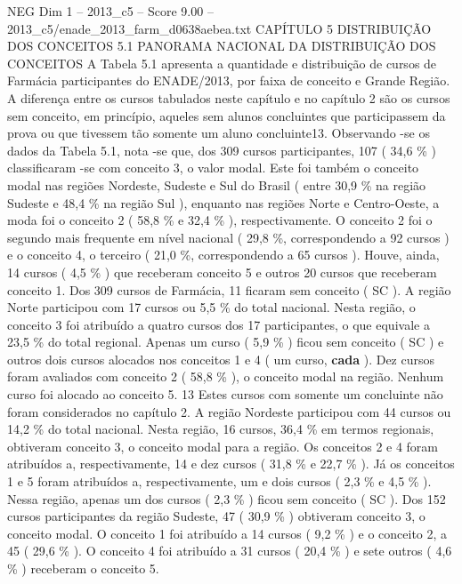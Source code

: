 \begin{textsample}{NEG Dim 1 – 2013\_c5 – Score 9.00 – 2013\_c5/enade\_2013\_farm\_d0638aebea.txt}  \label{ex:f1_neg_360}
CAPÍTULO 5 DISTRIBUIÇÃO DOS CONCEITOS 5.1 PANORAMA NACIONAL DA DISTRIBUIÇÃO DOS CONCEITOS A Tabela 5.1 apresenta a quantidade e distribuição de cursos de Farmácia participantes do ENADE/2013, por faixa de conceito e Grande Região.
A diferença entre os cursos tabulados neste capítulo e no capítulo 2 são os cursos sem conceito, em princípio, aqueles sem alunos concluintes que participassem da prova ou que tivessem tão somente um aluno concluinte13.
Observando -se os dados da Tabela 5.1, nota -se que, dos 309 cursos participantes, 107 ( 34,6 \% ) classificaram -se com conceito 3, o valor modal.
Este foi também o conceito modal nas regiões Nordeste, Sudeste e Sul do Brasil ( entre 30,9 \% na região Sudeste e 48,4 \% na região Sul ), enquanto nas regiões Norte e Centro-Oeste, a moda foi o conceito 2 ( 58,8 \% e 32,4 \% ), respectivamente.
O conceito 2 foi o segundo mais frequente em nível nacional ( 29,8 \%, correspondendo a 92 cursos ) e o conceito 4, o terceiro ( 21,0 \%, correspondendo a 65 cursos ).
Houve, ainda, 14 cursos ( 4,5 \% ) que receberam conceito 5 e outros 20 cursos que receberam conceito 1.
Dos 309 cursos de Farmácia, 11 ficaram sem conceito ( SC ).
A região Norte participou com 17 cursos ou 5,5 \% do total nacional.
Nesta região, o conceito 3 foi atribuído a quatro cursos dos 17 participantes, o que equivale a 23,5 \% do total regional.
Apenas um curso ( 5,9 \% ) ficou sem conceito ( SC ) e outros dois cursos alocados nos conceitos 1 e 4 ( um curso, \textbf{cada} ).
Dez cursos foram avaliados com conceito 2 ( 58,8 \% ), o conceito modal na região.
Nenhum curso foi alocado ao conceito 5. 13 Estes cursos com somente um concluinte não foram considerados no capítulo 2.
A região Nordeste participou com 44 cursos ou 14,2 \% do total nacional.
Nesta região, 16 cursos, 36,4 \% em termos regionais, obtiveram conceito 3, o conceito modal para a região.
Os conceitos 2 e 4 foram atribuídos a, respectivamente, 14 e dez cursos ( 31,8 \% e 22,7 \% ).
Já os conceitos 1 e 5 foram atribuídos a, respectivamente, um e dois cursos ( 2,3 \% e 4,5 \% ).
Nessa região, apenas um dos cursos ( 2,3 \% ) ficou sem conceito ( SC ).
Dos 152 cursos participantes da região Sudeste, 47 ( 30,9 \% ) obtiveram conceito 3, o conceito modal.
O conceito 1 foi atribuído a 14 cursos ( 9,2 \% ) e o conceito 2, a 45 ( 29,6 \% ).
O conceito 4 foi atribuído a 31 cursos ( 20,4 \% ) e sete outros ( 4,6 \% ) receberam o conceito 5.

\end{textsample}
